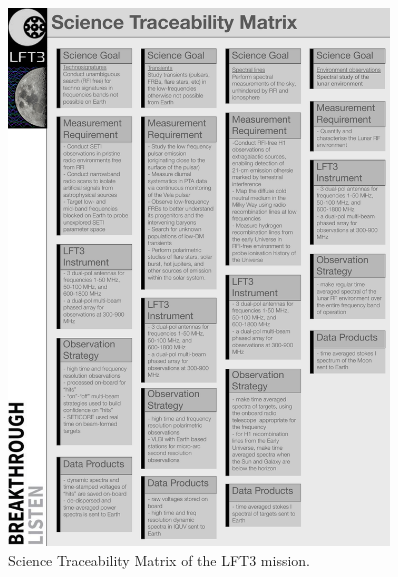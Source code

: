 \begin{figure}[h]
    \centering
    \includegraphics[width=0.9\textwidth]{figures/ScienceTraceabilityMatrix.pdf}
    \caption{Science Traceability Matrix of the LFT3 mission.}
    \label{fig:stm}
\end{figure}

